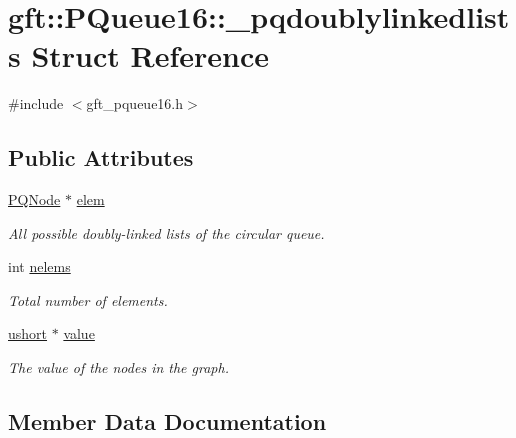\hypertarget{structgft_1_1PQueue16_1_1__pqdoublylinkedlists}{}\section{gft\+:\+:P\+Queue16\+:\+:\+\_\+pqdoublylinkedlists Struct Reference}
\label{structgft_1_1PQueue16_1_1__pqdoublylinkedlists}


{\ttfamily \#include $<$gft\+\_\+pqueue16.\+h$>$}

\subsection*{Public Attributes}
\begin{DoxyCompactItemize}
\item 
\hyperlink{namespacegft_1_1PQueue16_a2dc28c8f2a9eaeb5d7d7ae7ec5429314}{P\+Q\+Node} $\ast$ \hyperlink{structgft_1_1PQueue16_1_1__pqdoublylinkedlists_a7ea91d6d755456e562d4ac1cd481cafe}{elem}
\begin{DoxyCompactList}\small\item\em All possible doubly-\/linked lists of the circular queue. \end{DoxyCompactList}\item 
int \hyperlink{structgft_1_1PQueue16_1_1__pqdoublylinkedlists_ae51ba2f93a5a4ac83e9c3f2baf63bdc7}{nelems}
\begin{DoxyCompactList}\small\item\em Total number of elements. \end{DoxyCompactList}\item 
\hyperlink{namespacegft_a878518cf75338c097e2c8e9b10bfb00d}{ushort} $\ast$ \hyperlink{structgft_1_1PQueue16_1_1__pqdoublylinkedlists_acac5733fab27f2e9c9c9b42ecf373d1e}{value}
\begin{DoxyCompactList}\small\item\em The value of the nodes in the graph. \end{DoxyCompactList}\end{DoxyCompactItemize}


\subsection{Member Data Documentation}
